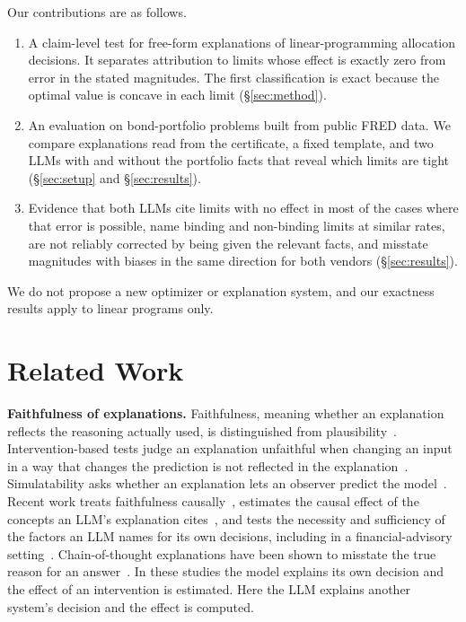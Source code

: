 Our contributions are as follows.
\begin{enumerate}\itemsep1pt
\item A claim-level test for free-form explanations of linear-programming
allocation decisions. It separates attribution to limits whose effect is
exactly zero from error in the stated magnitudes. The first classification is
exact because the optimal value is concave in each limit (\S\ref{sec:method}).
\item An evaluation on \nProblems{} bond-portfolio problems built from public
FRED data. We compare explanations read from the certificate, a fixed
template, and two LLMs with and without the portfolio facts that reveal which
limits are tight (\S\ref{sec:setup} and \S\ref{sec:results}).
\item Evidence that both LLMs cite limits with no effect in most of the cases
where that error is possible, name binding and non-binding limits at similar
rates, are not reliably corrected by being given the relevant facts, and
misstate magnitudes with biases in the same direction for both vendors
(\S\ref{sec:results}).
\end{enumerate}
We do not propose a new optimizer or explanation system, and our exactness
results apply to linear programs only.

\section{Related Work}
\label{sec:related}
\textbf{Faithfulness of explanations.} Faithfulness, meaning whether an
explanation reflects the reasoning actually used, is distinguished from
plausibility~\cite{jacovi20,lyu24}. Intervention-based tests judge an
explanation unfaithful when changing an input in a way that changes the
prediction is not reflected in the explanation~\cite{atanasova23}.
Simulatability asks whether an explanation lets an observer predict the
model~\cite{doshi17}. Recent work treats faithfulness causally~\cite{zaman25},
estimates the causal effect of the concepts an LLM's explanation
cites~\cite{matton25}, and tests the necessity and sufficiency of the factors an
LLM names for its own decisions, including in a financial-advisory
setting~\cite{pawar26}. Chain-of-thought explanations have been shown to
misstate the true reason for an answer~\cite{turpin23}. In these studies the
model explains its own decision and the effect of an intervention is estimated.
Here the LLM explains another system's decision and the effect is computed.


